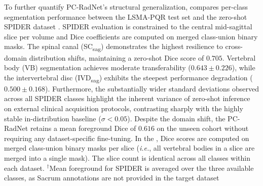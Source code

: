 \documentclass[journal]{IEEEtran}
\newcommand{\modelname}{PC-RadNet}
\newcommand{\ie}{\textit{i.e.}\xspace}
\begin{document}
\begin{table}[htbp]
\centering
\caption{Cross-dataset zero-shot evaluation of the \modelname{} framework. Evaluation relies strictly on per-class text prompting and plane-aware head selection without downstream fine-tuning. $\bar{D}$: Mean foreground Dice; W-1: Within-$\pm 1$ grade accuracy; Dis-F1: Primary disorder detection F1-score.}
\label{tab:external_summary}
\end{table}



To further quantify \modelname{}'s structural generalization,  compares per-class segmentation performance between the LSMA-PQR test set and the zero-shot SPIDER dataset \cite{van2024spider}. SPIDER evaluation is constrained to the central mid-sagittal slice per volume and Dice coefficients are computed on merged class-union binary masks. The spinal canal (SC\textsubscript{sag}) demonstrates the highest resilience to cross-domain distribution shifts, maintaining a zero-shot Dice score of $0.705$. Vertebral body (VB) segmentation achieves moderate transferability ($0.643 \pm 0.226$), while the intervertebral disc (IVD\textsubscript{sag}) exhibits the steepest performance degradation ($0.500 \pm 0.168$). Furthermore, the substantially wider standard deviations observed across all SPIDER classes highlight the inherent variance of zero-shot inference on external clinical acquisition protocols, contrasting sharply with the highly stable in-distribution baseline ($\sigma < 0.05$). Despite the domain shift, the \modelname{} retains a mean foreground Dice of $0.616$ on the unseen cohort without requiring any dataset-specific fine-tuning. In the , Dice scores are computed on merged class-union binary masks per slice (\ie, all vertebral bodies in a slice are merged into a single mask). The slice count is identical across all classes within each dataset. $^{\dagger}$Mean foreground for SPIDER is averaged over the three available classes, as Sacrum annotations are not provided in the target dataset
\end{document}
